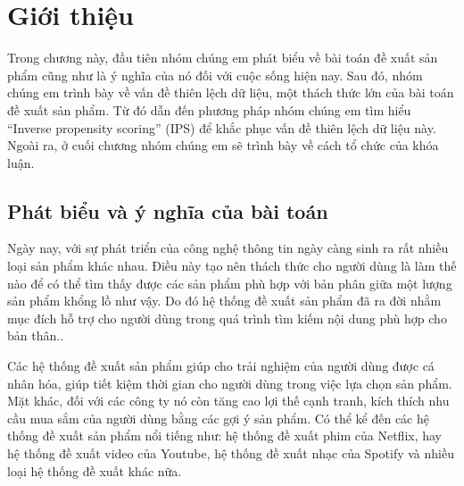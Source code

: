 \chapter{Giới thiệu}
\label{Chapter1}



Trong chương này, đầu tiên nhóm chúng em phát biểu về bài toán đề xuất sản phẩm cũng như là ý nghĩa của nó đối với cuộc sống hiện nay. Sau đó, nhóm chúng em trình bày về vấn đề thiên lệch dữ liệu, một thách thức lớn của bài toán đề xuất sản phẩm. Từ đó dẫn đến phương pháp nhóm chúng em tìm hiểu ``Inverse propensity scoring'' (IPS) để khắc phục vấn đề thiên lệch dữ liệu này. Ngoài ra, ở cuối chương nhóm chúng em sẽ trình bày về cách tổ chức của khóa luận.

\section{Phát biểu và ý nghĩa của bài toán}
Ngày nay, với sự phát triển của công nghệ thông tin ngày càng sinh ra rất nhiều loại sản phẩm khác nhau. Điều này tạo nên thách thức cho người dùng là làm thế nào để có thể tìm thấy được các sản phẩm phù hợp với bản phân giữa một lượng sản phẩm khổng lồ như vậy. Do đó hệ thống đề xuất sản phẩm đã ra đời nhằm mục đích hỗ trợ cho người dùng trong quá trình tìm kiếm nội dung phù hợp cho bản thân..

Các hệ thống đề xuất sản phẩm giúp cho trải nghiệm của người dùng được cá nhân hóa, giúp tiết kiệm thời gian cho người dùng trong việc lựa chọn sản phẩm. Mặt khác, đối với các công ty nó còn tăng cao lợi thế cạnh tranh, kích thích nhu cầu mua sắm của người dùng bằng các gợi ý sản phẩm. Có thể kể đến các hệ thống đề xuất sản phẩm nổi tiếng như: hệ thống đề xuất phim của Netflix, hay hệ thống đề xuất video của Youtube, hệ thống đề xuất nhạc của Spotify và nhiều loại hệ thống đề xuất khác nữa.

